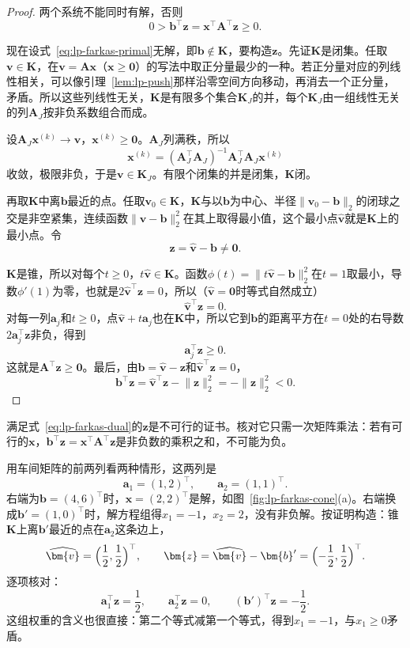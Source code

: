 \begin{proof}
 两个系统不能同时有解，否则
 \[
  0>\bm{b}^\top\bm{z}=\bm{x}^\top\bm{A}^\top\bm{z}\geq0.
 \]

 现在设式~\eqref{eq:lp-farkas-primal}无解，即$\bm{b}\notin\bm{K}$，要构造$\bm{z}$。先证$\bm{K}$是闭集。任取$\bm{v}\in\bm{K}$，在$\bm{v}=\bm{A}\bm{x}$（$\bm{x}\geq\bm{0}$）的写法中取正分量最少的一种。若正分量对应的列线性相关，可以像引理~\ref{lem:lp-push}那样沿零空间方向移动，再消去一个正分量，矛盾。所以这些列线性无关，$\bm{K}$是有限多个集合$\bm{K}_J$的并，每个$\bm{K}_J$由一组线性无关的列$\bm{A}_J$按非负系数组合而成。

 设$\bm{A}_J\bm{x}^{(k)}\to\bm{v}$，$\bm{x}^{(k)}\geq\bm{0}$。$\bm{A}_J$列满秩，所以
 \[
  \bm{x}^{(k)}=(\bm{A}_J^\top\bm{A}_J)^{-1}\bm{A}_J^\top\bm{A}_J\bm{x}^{(k)}
 \]
 收敛，极限非负，于是$\bm{v}\in\bm{K}_J$。有限个闭集的并是闭集，$\bm{K}$闭。

 再取$\bm{K}$中离$\bm{b}$最近的点。任取$\bm{v}_0\in\bm{K}$，$\bm{K}$与以$\bm{b}$为中心、半径$\lVert\bm{v}_0-\bm{b}\rVert_2$的闭球之交是非空紧集，连续函数$\lVert\bm{v}-\bm{b}\rVert_2^2$在其上取得最小值，这个最小点$\widehat{\bm{v}}$就是$\bm{K}$上的最小点。令
 \[
  \bm{z}=\widehat{\bm{v}}-\bm{b}\neq\bm{0}.
 \]

 $\bm{K}$是锥，所以对每个$t\geq0$，$t\widehat{\bm{v}}\in\bm{K}$。函数$\phi(t)=\lVert t\widehat{\bm{v}}-\bm{b}\rVert_2^2$在$t=1$取最小，导数$\phi'(1)$为零，也就是$2\widehat{\bm{v}}^\top\bm{z}=0$，所以（$\widehat{\bm{v}}=\bm{0}$时等式自然成立）
 \[
  \widehat{\bm{v}}^\top\bm{z}=0.
 \]
 对每一列$\bm{a}_j$和$t\geq0$，点$\widehat{\bm{v}}+t\bm{a}_j$也在$\bm{K}$中，所以它到$\bm{b}$的距离平方在$t=0$处的右导数$2\bm{a}_j^\top\bm{z}$非负，得到
 \[
  \bm{a}_j^\top\bm{z}\geq0.
 \]
 这就是$\bm{A}^\top\bm{z}\geq\bm{0}$。最后，由$\bm{b}=\widehat{\bm{v}}-\bm{z}$和$\widehat{\bm{v}}^\top\bm{z}=0$，
 \[
  \bm{b}^\top\bm{z}=\widehat{\bm{v}}^\top\bm{z}-\lVert\bm{z}\rVert_2^2=-\lVert\bm{z}\rVert_2^2<0.
 \]
\end{proof}

满足式~\eqref{eq:lp-farkas-dual}的$\bm{z}$是不可行的证书。核对它只需一次矩阵乘法：若有可行的$\bm{x}$，$\bm{b}^\top\bm{z}=\bm{x}^\top\bm{A}^\top\bm{z}$是非负数的乘积之和，不可能为负。

用车间矩阵的前两列看两种情形，这两列是
\[
 \bm{a}_1=(1,2)^\top,\qquad\bm{a}_2=(1,1)^\top.
\]
右端为$\bm{b}=(4,6)^\top$时，$\bm{x}=(2,2)^\top$是解，如图~\ref{fig:lp-farkas-cone}(a)。右端换成$\bm{b}'=(1,0)^\top$时，解方程组得$x_1=-1$，$x_2=2$，没有非负解。按证明构造：锥$\bm{K}$上离$\bm{b}'$最近的点在$\bm{a}_2$这条边上，
\[
 \widehat{\bm{v}}=\Bigl(\frac12,\frac12\Bigr)^\top,\qquad\bm{z}=\widehat{\bm{v}}-\bm{b}'=\Bigl(-\frac12,\frac12\Bigr)^\top.
\]
逐项核对：
\[
 \bm{a}_1^\top\bm{z}=\frac12,\qquad\bm{a}_2^\top\bm{z}=0,\qquad(\bm{b}')^\top\bm{z}=-\frac12.
\]
这组权重的含义也很直接：第二个等式减第一个等式，得到$x_1=-1$，与$x_1\geq0$矛盾。

